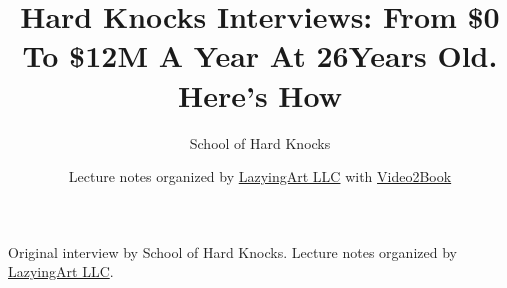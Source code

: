 \documentclass[11pt,oneside]{book}
\begin{document}
\frontmatter
\title{Hard Knocks Interviews: From \$0 To \$12M A Year At 26Years Old. Here's How}
\author{School of Hard Knocks}
\date{Lecture notes organized by \href{https://lazying.art}{LazyingArt LLC} with \href{https://github.com/lachlanchen/Video2Book}{Video2Book}}
\maketitle
\begin{center}
\small Original interview by School of Hard Knocks. Lecture notes organized by \href{https://lazying.art}{LazyingArt LLC}.
\end{center}
\clearpage
\mainmatter

\end{document}

